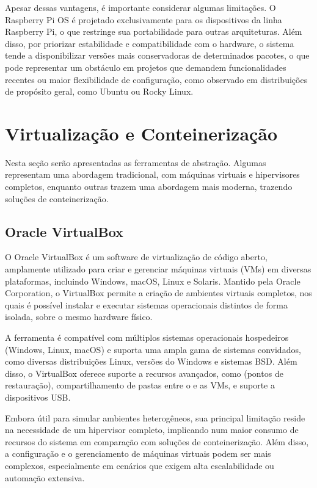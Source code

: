 Apesar dessas vantagens, é importante considerar algumas limitações. O Raspberry Pi OS é projetado exclusivamente para os dispositivos da linha Raspberry Pi, o que restringe sua portabilidade para outras arquiteturas. Além disso, por priorizar estabilidade e compatibilidade com o hardware, o sistema tende a disponibilizar versões mais conservadoras de determinados pacotes, o que pode representar um obstáculo em projetos que demandem funcionalidades recentes ou maior flexibilidade de configuração, como observado em distribuições de propósito geral, como Ubuntu ou Rocky Linux.

\section{Virtualização e Conteinerização}
\label{section:Virtualizacao}

Nesta seção serão apresentadas as ferramentas de abstração. Algumas representam uma abordagem tradicional, com máquinas virtuais e hipervisores completos, enquanto outras trazem uma abordagem mais moderna, trazendo soluções de conteinerização.

\subsection{Oracle VirtualBox}
\label{subsection:VirtualBox}

O Oracle VirtualBox \citep{virtualbox2025} é um software de virtualização de código aberto, amplamente utilizado para criar e gerenciar máquinas virtuais (VMs) em diversas plataformas, incluindo Windows, macOS, Linux e Solaris. Mantido pela Oracle Corporation, o VirtualBox permite a criação de ambientes virtuais completos, nos quais é possível instalar e executar sistemas operacionais distintos de forma isolada, sobre o mesmo hardware físico.

A ferramenta é compatível com múltiplos sistemas operacionais hospedeiros (Windows, Linux, macOS) e suporta uma ampla gama de sistemas convidados, como diversas distribuições Linux, versões do Windows e sistemas BSD. Além disso, o VirtualBox oferece suporte a recursos avançados, como  (pontos de restauração), compartilhamento de pastas entre o  e as VMs, e suporte a dispositivos USB.

Embora útil para simular ambientes heterogêneos, sua principal limitação reside na necessidade de um hipervisor completo, implicando num maior consumo de recursos do sistema em comparação com soluções de conteinerização. Além disso, a configuração e o gerenciamento de máquinas virtuais podem ser mais complexos, especialmente em cenários que exigem alta escalabilidade ou automação extensiva.

